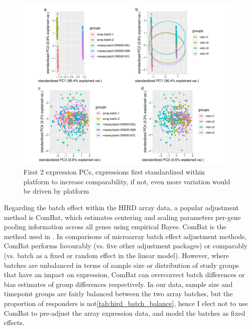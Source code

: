 \begin{figure}
    \includegraphics[width=1.0\textwidth,page=1]{mainmatter/figures/chapter_02/compare_phenotype_by_platform.E_pca.pdf}
    \caption{First 2 expression PCs, expressions first standardized within platform to increase comparability, if not, even more variation would be driven by platform}
    \label{fig:hird_expression_pcs}
\end{figure}

Regarding the batch effect within the \gls{HIRD} array data, a popular adjustment method is ComBat\autocite{johnson2007AdjustingBatchEffects}, which estimates centering and scaling parameters per-gene pooling information across all genes using empirical Bayes.
ComBat is the method used in \autocite{sobolev2016AdjuvantedInfluenzaH1N1Vaccination}.
In comparisons of microarray batch effect adjustment methods, ComBat performs favourably (vs. five other adjustment packages)\autocite{chen2011RemovingBatchEffects} or comparably (vs. batch as a fixed or random effect in the linear model)\autocite{espin-perez2018ComparisonStatisticalMethods}.
However, where batches are unbalanced in terms of sample size\autocite{zhang2018AlternativeEmpiricalBayes} or distribution of study groups that have an impact on expression\autocite{nygaard2015MethodsThatRemove}, ComBat can overcorrect batch differences or bias estimates of group differences respectively.
In our data, sample size and timepoint groups are fairly balanced between the two array batches, but the proportion of responders is not\autoref{tab:hird_batch_balance}, hence I elect not to use ComBat to pre-adjust the array expression data, and model the batches as fixed effects.

